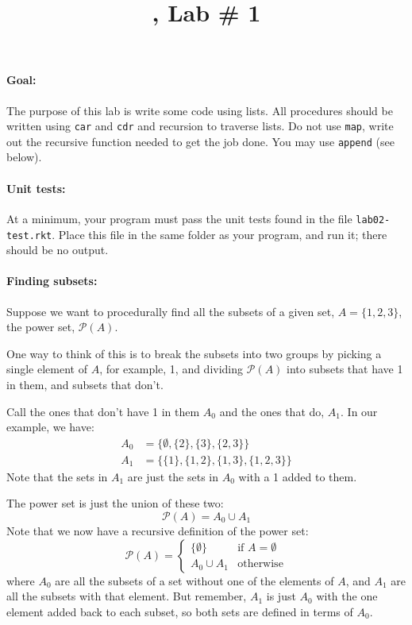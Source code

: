 \documentclass[letterpaper,12pt]{article}
\title{\course, Lab \# 1}
\author{\term}
\date{}
\newcommand{\set}[1]{\ensuremath{\{#1\}}}
\newcommand{\power}[1]{\ensuremath{\mathcal{P}(#1)}}
\begin{document}
\maketitle
\setlength{\columnsep}{2em}

\begin{multicols}{2}

  \paragraph{Goal:} The purpose of this lab is write some  code 
  using lists.  All procedures should be written using {\tt car} and
  {\tt cdr} and recursion to traverse lists.  Do not use {\tt map},
  write out the recursive function needed to get the job done.  You may
  use {\tt append} (see below).
  
  \paragraph{Unit tests:}
  At a minimum, your program must pass the unit tests found in the
  file {\tt lab02-test.rkt}.  Place this file in the same folder
  as your program, and run it;  there should be no output.
  
  \paragraph{Finding subsets:}  Suppose we want to procedurally find all
  the subsets of a given set, $A=\set{1,2,3}$, the power set,
  $\mathcal{P}(A)$.
  
  One way to think of this is to break the subsets
  into two groups by picking a single element of $A$, for example, 1,
  and dividing \power{A} into subsets that have 1 in them, and subsets that
  don't.

  Call the ones that don't have 1 in them $A_0$ and the ones
  that do, $A_1$.  In our example, we have:
  \begin{align*}
    A_0 &= \set{\emptyset,\set{2},\set{3},\set{2,3}}\\
    A_1 &= \set{\set{1},\set{1,2},\set{1,3},\set{1,2,3}}
  \end{align*}
  Note that the sets in $A_1$ are just the sets in $A_0$ with a 1 added
  to them.
  
  The power set is just the union of these two:
  \[
    \power{A} = A_0 \cup A_1
  \]
  Note that we now have a recursive definition of the power set:
  \[
    \power{A} = \left\{
      \begin{array}{ll}
        \set{\emptyset} & \mbox{if $A=\emptyset$}\\
        A_0 \cup A_1 & \mbox{otherwise}
      \end{array}
    \right.
  \]
  where $A_0$ are all the subsets of a set without one of the elements
  of $A$, and $A_1$ are all the subsets with that element.  But remember,
  $A_1$ is just $A_0$ with the one element added back to each subset,
  so both sets
  are defined in terms of $A_0$.


\end{multicols}
\end{document}

